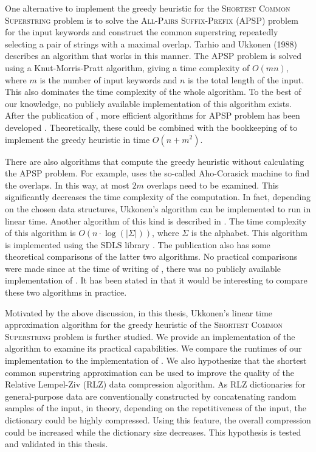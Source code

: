 \documentclass[english,twoside,censored,csm,algorithms-track-2020]{HYthesisML}
\theoremstyle{plain}
\theoremstyle{definition}
\begin{document}
One alternative to implement the greedy heuristic for the \textsc{Shortest Common Superstring}
problem is to solve the 
\textsc{All-Pairs Suffix-Prefix} (APSP) problem \citep{Lim17} for the input keywords and construct the
common superstring repeatedly selecting a pair of strings with a maximal overlap.
Tarhio and Ukkonen (1988) describes an algorithm that works in this manner. The APSP problem is solved
using a Knut-Morris-Pratt algorithm, giving a time complexity of $O(mn)$, where $m$ is the
number of input keywords and $n$ is the total length of the input. This also dominates the time
complexity of the whole algorithm. To the best of our knowledge, no publicly available
implementation of this algorithm exists. After the publication of \citep{Tarhio88}, more efficient
algorithms for APSP problem has been developed \citep{Gusfield92}. Theoretically, these could be
combined with the bookkeeping of \citep{Tarhio88} to implement the greedy heuristic in time
$O(n+m^2)$.

There are also algorithms that compute the greedy heuristic without calculating the APSP problem.
For example, \citep{Ukkonen90} uses the so-called Aho-Corasick machine to find the overlaps. In this way,
at most $2m$ overlaps need to be examined. This significantly decreases the time complexity of
the computation. In fact, depending on the chosen data structures, Ukkonen's algorithm can be implemented
to run in linear time.
Another algorithm of this kind is described in \citep{Alanko17}.
The time complexity of this
algorithm is $O(n\cdot\log(|\Sigma|))$, where $\Sigma$ is the alphabet.
This algorithm is implemented using the SDLS library  \citep{SDLS}. The publication also has some
theoretical comparisons of the latter two algorithms. No practical comparisons were made since at the
time of writing of \citep{Alanko17}, there was no publicly available implementation of
\citep{Ukkonen90}. It has been stated in \citep{Alanko17} that
it would be interesting to compare these two algorithms in practice.

Motivated by the above discussion, in this thesis, Ukkonen's linear time approximation algorithm
for the greedy heuristic of the \textsc{Shortest Common Superstring} problem is further studied.
We provide an implementation of the algorithm to examine its practical capabilities.
We compare the runtimes of our implementation to the implementation of \citep{Alanko17}.
We also hypothesize that the shortest common superstring approximation can be used to
improve the quality of the Relative Lempel-Ziv (RLZ) data compression algorithm. As RLZ dictionaries
for general-purpose data are conventionally
constructed by concatenating random samples of the input, in theory,
depending on the repetitiveness of the input, the dictionary could be highly compressed.
Using this feature, the overall compression could be increased while the dictionary size
decreases. This hypothesis is tested and validated in this thesis. 
\end{document}
